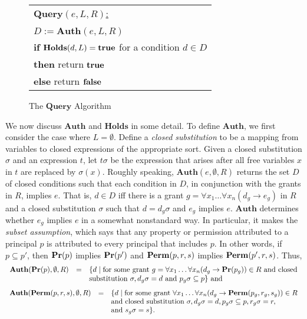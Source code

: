 \documentclass{acmtrans2m}
\newcommand{\<}{
}
\renewcommand{\>}{\rangle}
\newcommand{\true}{\mathit{\bf{true}}}
\newcommand{\false}{\mathit{\bf{false}}}
\newcommand{\Permitted}{\mathit{\bf Perm}}
\renewcommand{\Pr}{\mathit{\bf Pr}}
\newcommand{\cd}{d}
\newcommand{\cc}{e}
\newcommand{\imp}{\rightarrow}
\newcommand{\XA}{\textbf{Auth}}
\newcommand{\CMet}{\textbf{Holds}}
\newcommand{\XProc}{\textbf{Query}}
\begin{document}
\begin{figure*}[htb]
\begin{center}
\begin{tabular}{|l|}\hline
\underline{$\XProc(\cc, L, R)$:}\\\\
$D := \XA(\cc, L, R)$\\
{\bf if} $\CMet(\cd, L) = \true$ for a condition $\cd\in D$\\
{\bf then} return $\true$\\
{\bf else} return $\false$\\
\hline
\end{tabular}
\end{center}
\caption{The $\XProc$ Algorithm}
\label{tb:XrMLProc1}
\end{figure*}

We now discuss $\XA$ and $\CMet$ in some detail.  To define $\XA$, we first consider the case where
$L = \emptyset$.  Define a \emph{closed substitution} to be a mapping from variables to closed
expressions of the appropriate sort.  Given a closed substitution $\sigma$ and an expression $t$, let
$t\sigma$ be the expression that arises after all free variables $x$ in $t$ are replaced by
$\sigma(x)$.  Roughly speaking, $\XA(\cc, \emptyset, R)$ returns the set $D$ of closed conditions such
that each condition in $D$, in conjunction with the grants in $R$, implies $\cc$.  That is, $\cd\in D$
iff there is a grant $g = \forall x_1\ldots\forall x_n(\cd_g\imp\cc_g)$ in $R$ and a closed
substitution $\sigma$ such that $\cd = \cd_g\sigma$ and $\cc_g$ implies $\cc$.  $\XA$ determines
whether $\cc_g$ implies $\cc$ in a somewhat nonstandard way.  In particular, it makes the
\emph{subset assumption}, which says that any property or permission attributed to a principal $p$ is
attributed to every principal that includes $p$.  In other words, if $p\subseteq p'$, then $\Pr(p)$
implies $\Pr(p')$ and $\Permitted(p, r, s)$ implies $\Permitted(p', r, s)$.  Thus,
\[
\begin{array}{lll}
\XA(\Pr(p), \emptyset, R) &=&
\{\cd\mid\mbox{for some grant }g = \forall x_1\ldots\forall
x_n(\cd_g\imp\Pr(p_g))\in R
\mbox{ and closed}\\
&&\mbox{substitution }\sigma, \cd_g\sigma
= \cd\mbox{ and } p_g\sigma \subseteq p\} \mbox{ and }
\end{array}
\]
\[
\begin{array}{lll}
\XA(\Permitted(p, r, s), \emptyset, R) &=&
\{\cd\mid\mbox{for some grant }
\forall x_1\ldots\forall x_n(\cd_g\imp\Permitted(p_g, r_g, s_g))\in R\\
&&\mbox{and closed substitution }\sigma,
\cd_g\sigma = \cd, p_g\sigma \subseteq p, r_g\sigma = r,\\
&&\mbox{and } s_g\sigma = s\}.
\end{array}
\]
\end{document}
